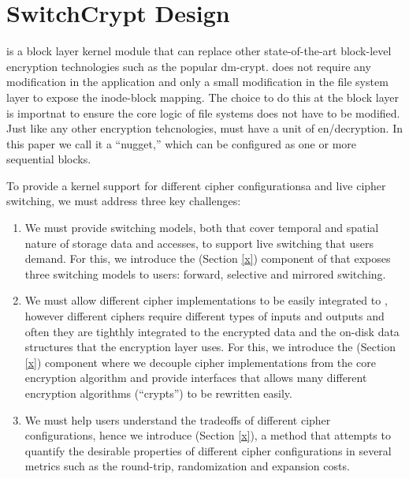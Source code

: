 \section{SwitchCrypt Design} \label{sec:design}



% 

\sys is a block layer kernel module that can replace other
state-of-the-art block-level encryption technologies such as the popular
dm-crypt.  \sys does not require any modification in the application and
only a small modification in the file system layer to expose the
inode-block mapping.  The choice to do this at the block layer is
importnat to ensure the core logic of file systems does not have to be
modified.  Just like any other encryption tehcnologies, \sys must have a
unit of en/decryption.  In this paper we call it a ``nugget,'' which can
be configured as one or more sequential blocks.

To provide a kernel support for different cipher configurationsa and live
cipher switching, we must address three key challenges:

\begin{enumerate}

\item We must provide switching models, both that cover temporal and
  spatial nature of storage data and accesses, to support live switching
  that users demand.  For this, we introduce the \sysA (Section \ref{x})
  component of \sys that exposes three switching models to users: forward,
  selective and mirrored switching.

\item We must allow different cipher implementations to be easily
  integrated to \sys, however different ciphers require different types of
  inputs and outputs and often they are tighthly integrated to the
  encrypted data and the on-disk data structures that the encryption layer
  uses.  For this, we introduce the \sysB (Section \ref{x}) component where we
  decouple cipher implementations from the core encryption algorithm and
  provide interfaces that allows many different encryption algorithms
  (``crypts'') to be rewritten easily.

\item We must help users understand the tradeoffs of different cipher
  configurations, hence we introduce \sysC (Section \ref{x}), a method that
  attempts to quantify the desirable properties of different cipher
  configurations in several metrics such as the round-trip, randomization
  and expansion costs.

\end{enumerate}

